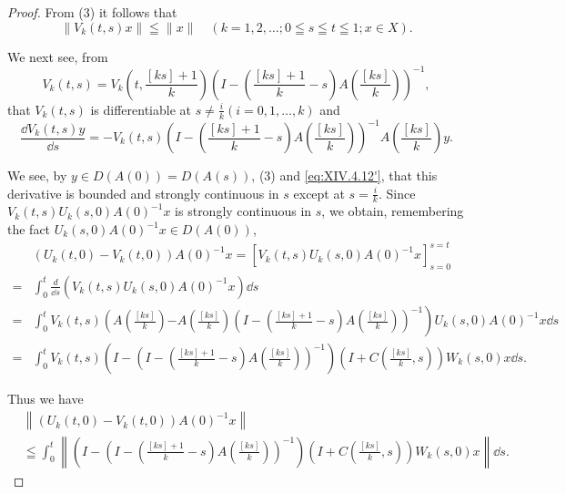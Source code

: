 \begin{proof}
 From ($3$) it follows that 
\begin{equation}\tag{12'}\label{eq:XIV.4.12'}
\| V _{k} (t, s) x \| \leqq \| x \| \quad (k = 1, 2, \dots ; 0 \leqq s \leqq t \leqq 1; x \in X). \end{equation}

We next see, from 
\[
V _{k} (t, s) = V _{k} \left(t, \frac {[ k s ] + 1}{k}\right) \left(I - \left(\frac {[ k s ] + 1}{k} - s\right) A \left(\frac {[ k s ]}{k}\right)\right) ^{-1},
\]
that $V_{k}(t, s)$ is differentiable at $s \neq \frac{i}{k} (i = 0, 1, \ldots, k)$ and 
\begin{equation}\tag{19'}\label{eq:XIV.4.19'}
\frac {\dd V _{k} (t , s) y}{\dd s} = - V _{k} (t, s) \left(I - \left(\frac {[ k s ] + 1}{k} - s\right) A \left(\frac {[ k s ]}{k}\right)\right) ^{-1} A \left(\frac {[ k s ]}{k}\right) y.
\end{equation}

We see, by $y \in D(A(0)) = D(A(s))$, ($3$) and \eqref{eq:XIV.4.12'}, that this derivative is bounded and strongly continuous in $s$ except at $s = \frac{i}{k}$. Since 
$V_{k}(t,s)U_{k}(s,0)A(0)^{-1}x$ is strongly continuous in $s$, we obtain, remembering the fact $U_{k}(s,0)A(0)^{-1}x\in D(A(0))$, 
\[
\begin{aligned}
& \left(U _{k} (t, 0) - V _{k} (t, 0)\right) A (0) ^{-1} x = \left[ V _{k} (t, s) U _{k} (s, 0) A (0) ^{-1} x \right] _{s=0} ^{s=t}
\\
= & \int_{0} ^{t} \frac {d}{\dd s} \left(V _{k} (t, s) U _{k} (s, 0) A (0) ^{-1} x\right) \dd s
\\
= & \int_{0} ^{t} V _{k} (t, s) \left(A \left(\frac {[ k s ]}{k}\right)\right. \left.- A \left(\frac {[ k s ]}{k}\right) \left(I - \left(\frac {[ k s ] + 1}{k} - s\right) A \left(\frac {[ k s ]}{k}\right)\right) ^{-1}\right) U _{k} (s, 0) A (0) ^{-1} x \dd s
\\
= & \int_{0} ^{t} V _{k} (t, s) \left(I - \left(I - \left(\frac {[ k s ] + 1}{k} - s\right) A \left(\frac {[ k s ]}{k}\right)\right) ^{-1}\right)\left(I + C \left(\frac {[ k s ]}{k}, s\right)\right) W _{k} (s, 0) x \dd s.
\end{aligned}
\]

Thus we have 
\begin{equation}\label{eq:XIV.4.24}
\begin{aligned}
& \left\| \left(U _{k} (t, 0) - V _{k} (t, 0)\right) A (0) ^{-1} x \right\|
\\
&\leqq \int_{0} ^{t} \left\| \left(I - \left(I - \left(\frac {[ k s ] + 1}{k} - s\right) A \left(\frac {[ k s ]}{k}\right)\right) ^{-1}\right) \left(I + C \left(\frac {[ k s ]}{k}, s\right)\right) W _{k} (s, 0) x \right\| \dd s.
\end{aligned}
\end{equation}


\end{proof}
